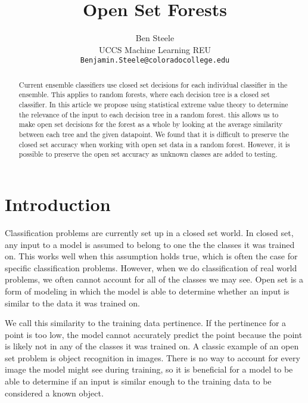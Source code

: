 \documentclass[conference]{IEEEtran}
\author{
Ben Steele \\
UCCS Machine Learning REU \\
\texttt{Benjamin.Steele@coloradocollege.edu} \\
}
\begin{document}
\title{Open Set Forests}

\author{
}

\maketitle

\begin{abstract}
Current ensemble classifiers use closed set decisions for each individual classifier in the ensemble.  This applies to random forests, where each decision tree is a closed set classifier.  In this article we propose using statistical extreme value theory to determine the relevance of the input to each decision tree in a random forest.  this allows us to make open set decisions for the forest as a whole by looking at the average similarity between each tree and the given datapoint.  We found that it is difficult to preserve the closed set accuracy when working with open set data in a random forest.  However, it is possible to preserve the open set accuracy as unknown classes are added to testing.

\end{abstract}
\section{Introduction}

 Classification problems are currently set up in a closed set world.  In closed set, any input to a model is assumed to belong to one the the classes it was trained on.  This works well when this assumption holds true, which is often the case for specific classification problems.  However, when we do classification of real world problems, we often cannot account for all of the classes we may see.  Open set is a form of modeling in which the model is able to determine whether an input is similar to the data it was trained on.  
 
 We call this similarity to the training data pertinence.  If the pertinence for a point is too low, the model cannot accurately predict the point because the point is likely not in any of the classes it was trained on.  A classic example of an open set problem is object recognition in images.  There is no way to account for every image the model might see during training, so it is beneficial for a model to be able to determine if an input is similar enough to the training data to be considered a known object.
\end{document}
